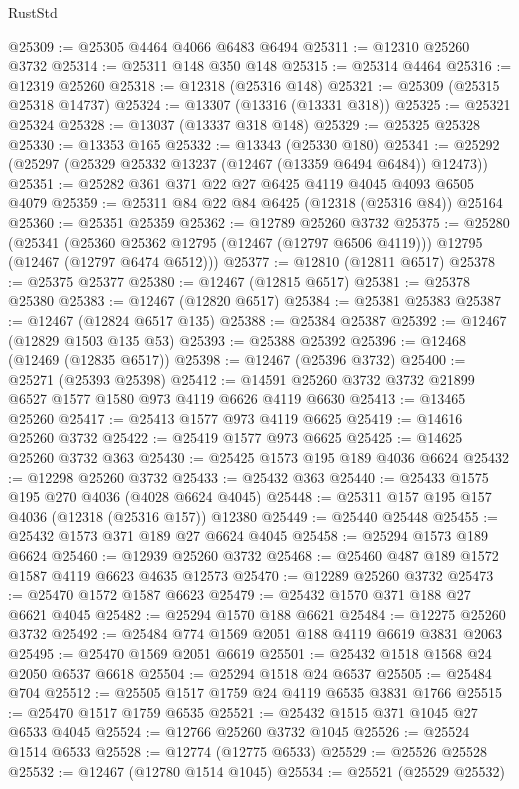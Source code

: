 \begin{lexlean}{RustStd}
\begin{coremodule}
@25309 := @25305 @4464 @4066 @6483 @6494
@25311 := @12310 @25260 @3732
@25314 := @25311 @148 @350 @148
@25315 := @25314 @4464
@25316 := @12319 @25260
@25318 := @12318 (@25316 @148)
@25321 := @25309 (@25315 @25318 @14737)
@25324 := @13307 (@13316 (@13331 @318))
@25325 := @25321 @25324
@25328 := @13037 (@13337 @318 @148)
@25329 := @25325 @25328
@25330 := @13353 @165
@25332 := @13343 (@25330 @180)
@25341 := @25292 (@25297 (@25329 @25332 @13237 (@12467 (@13359 @6494 @6484)) @12473))
@25351 := @25282 @361 @371 @22 @27 @6425 @4119 @4045 @4093 @6505 @4079
@25359 := @25311 @84 @22 @84 @6425 (@12318 (@25316 @84)) @25164
@25360 := @25351 @25359
@25362 := @12789 @25260 @3732
@25375 := @25280
    (@25341
      (@25360 @25362 @12795 (@12467 (@12797 @6506 @4119)))
      @12795
      (@12467 (@12797 @6474 @6512)))
@25377 := @12810 (@12811 @6517)
@25378 := @25375 @25377
@25380 := @12467 (@12815 @6517)
@25381 := @25378 @25380
@25383 := @12467 (@12820 @6517)
@25384 := @25381 @25383
@25387 := @12467 (@12824 @6517 @135)
@25388 := @25384 @25387
@25392 := @12467 (@12829 @1503 @135 @53)
@25393 := @25388 @25392
@25396 := @12468 (@12469 (@12835 @6517))
@25398 := @12467 (@25396 @3732)
@25400 := @25271 (@25393 @25398)
@25412 := @14591 @25260 @3732 @3732 @21899 @6527 @1577 @1580 @973 @4119 @6626 @4119 @6630
@25413 := @13465 @25260
@25417 := @25413 @1577 @973 @4119 @6625
@25419 := @14616 @25260 @3732
@25422 := @25419 @1577 @973 @6625
@25425 := @14625 @25260 @3732 @363
@25430 := @25425 @1573 @195 @189 @4036 @6624
@25432 := @12298 @25260 @3732
@25433 := @25432 @363
@25440 := @25433 @1575 @195 @270 @4036 (@4028 @6624 @4045)
@25448 := @25311 @157 @195 @157 @4036 (@12318 (@25316 @157)) @12380
@25449 := @25440 @25448
@25455 := @25432 @1573 @371 @189 @27 @6624 @4045
@25458 := @25294 @1573 @189 @6624
@25460 := @12939 @25260 @3732
@25468 := @25460 @487 @189 @1572 @1587 @4119 @6623 @4635 @12573
@25470 := @12289 @25260 @3732
@25473 := @25470 @1572 @1587 @6623
@25479 := @25432 @1570 @371 @188 @27 @6621 @4045
@25482 := @25294 @1570 @188 @6621
@25484 := @12275 @25260 @3732
@25492 := @25484 @774 @1569 @2051 @188 @4119 @6619 @3831 @2063
@25495 := @25470 @1569 @2051 @6619
@25501 := @25432 @1518 @1568 @24 @2050 @6537 @6618
@25504 := @25294 @1518 @24 @6537
@25505 := @25484 @704
@25512 := @25505 @1517 @1759 @24 @4119 @6535 @3831 @1766
@25515 := @25470 @1517 @1759 @6535
@25521 := @25432 @1515 @371 @1045 @27 @6533 @4045
@25524 := @12766 @25260 @3732 @1045
@25526 := @25524 @1514 @6533
@25528 := @12774 (@12775 @6533)
@25529 := @25526 @25528
@25532 := @12467 (@12780 @1514 @1045)
@25534 := @25521 (@25529 @25532)

\end{coremodule}
\end{lexlean}
